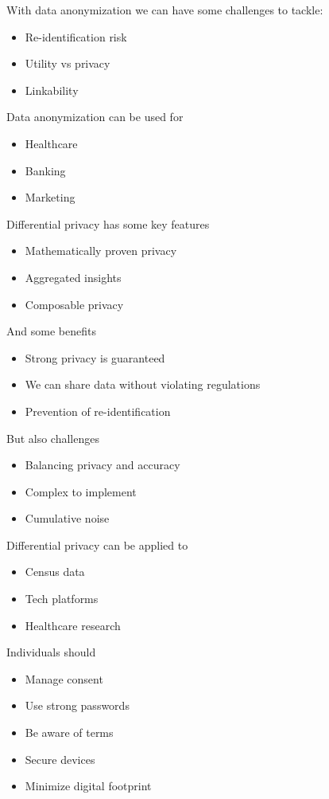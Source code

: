 With data anonymization we can have some challenges to tackle:
\begin{itemize}
    \item Re-identification risk
    \item Utility vs privacy
    \item Linkability
\end{itemize}

Data anonymization can be used for
\begin{itemize}
    \item Healthcare
    \item Banking
    \item Marketing
\end{itemize}

Differential privacy has some key features
\begin{itemize}
    \item Mathematically proven privacy
    \item Aggregated insights
    \item Composable privacy
\end{itemize}

And some benefits

\begin{itemize}
    \item Strong privacy is guaranteed
    \item We can share data without violating regulations
    \item Prevention of re-identification
\end{itemize}

But also challenges
\begin{itemize}
    \item Balancing privacy and accuracy
    \item Complex to implement
    \item Cumulative noise
\end{itemize}

Differential privacy can be applied to
\begin{itemize}
    \item Census data
    \item Tech platforms
    \item Healthcare research
\end{itemize}

Individuals should

\begin{itemize}
    \item Manage consent
    \item Use strong passwords
    \item Be aware of terms
    \item Secure devices
    \item Minimize digital footprint
\end{itemize}

